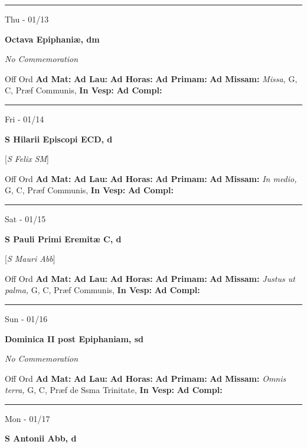 \documentclass[letterpaper, 10pt]{article}
\begin{document}
\hrule
\begin{center}
Thu - 01/13
\end{center}\textbf{ \large Octava Epiphaniæ, \textnormal{\normalsize dm}}

\textit{No Commemoration}\begin{justify}
Off Ord
\textbf{Ad Mat: }
\textbf{Ad Lau: }
\textbf{Ad Horas: }
\textbf{Ad Primam: }
\textbf{Ad Missam:} \textit{Missa, } G, C, Præf Communis, 
\textbf{In Vesp: }
\textbf{Ad Compl: }\end{justify}



\hrule
\begin{center}
Fri - 01/14
\end{center}\textbf{ \large S Hilarii Episcopi ECD, \textnormal{\normalsize d}}

[\textit{S Felix SM}]
\begin{justify}
Off Ord
\textbf{Ad Mat: }
\textbf{Ad Lau: }
\textbf{Ad Horas: }
\textbf{Ad Primam: }
\textbf{Ad Missam:} \textit{In medio, } G, C, Præf Communis, 
\textbf{In Vesp: }
\textbf{Ad Compl: }\end{justify}



\hrule
\begin{center}
Sat - 01/15
\end{center}\textbf{ \large S Pauli Primi Eremitæ C, \textnormal{\normalsize d}}

[\textit{S Mauri Abb}]
\begin{justify}
Off Ord
\textbf{Ad Mat: }
\textbf{Ad Lau: }
\textbf{Ad Horas: }
\textbf{Ad Primam: }
\textbf{Ad Missam:} \textit{Justus ut palma, } G, C, Præf Communis, 
\textbf{In Vesp: }
\textbf{Ad Compl: }\end{justify}



\hrule
\begin{center}
Sun - 01/16
\end{center}\textbf{ \large Dominica II post Epiphaniam, \textnormal{\normalsize sd}}

\textit{No Commemoration}\begin{justify}
Off Ord
\textbf{Ad Mat: }
\textbf{Ad Lau: }
\textbf{Ad Horas: }
\textbf{Ad Primam: }
\textbf{Ad Missam:} \textit{Omnis terra, } G, C, Præf de Ssma Trinitate, 
\textbf{In Vesp: }
\textbf{Ad Compl: }\end{justify}



\hrule
\begin{center}
Mon - 01/17
\end{center}\textbf{ \large S Antonii Abb, \textnormal{\normalsize d}}
\end{document}
